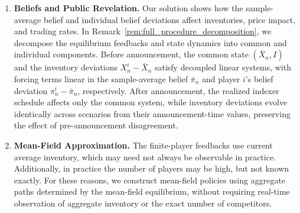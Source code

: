 \documentclass[12pt]{article}
\numberwithin{equation}{section}
\theoremstyle{definition}
\begin{document}
\begin{enumerate}
Standard ODE theory guarantees only local solvability of the Riccati
equation. The cost contains indefinite cross terms between trading rates
and outstanding impact, so there is no immediate bound ruling out
finite-time blow-up before the backward solution reaches time zero.
Yet, under the economically reasonable conditions ruling out price manipulation
stated in Assumption~\ref{ass:standing_model},
Theorem~\ref{thm:global_riccati_solvability} establishes upper and lower bounds
\begin{equation}\label{eq:intro_riccati_bounds}
-\underline H(t)\preceq H_n(t)\preceq\overline H(t),
\qquad 0\leq t\leq T,
\end{equation}
uniformly over \(n\geq2\). The bounds prevent finite-time blow-up and
yield a unique Riccati solution on every finite horizon and hence a
subgame-perfect Nash equilibrium. No short-horizon restriction or additional
smallness condition on transient impact is required.
To our knowledge, this is the first globally solvable continuous-time,
finite-player, closed-loop execution game with transient price impact.
Most related finite-player execution games instead study open-loop equilibria
\citep{strehle_2017,schied_zhang_2017,schied_strehle_zhang_2017,
schied_zhang_2019,luo_schied_2019,NeumanVoss2023,
campbell2026optimalexecutionntraders} for which existence of a Nash equilibrium is
usually easier to prove.

\item \textbf{Beliefs and Public Revelation.}
Our solution shows how the sample-average belief and individual belief
deviations affect inventories, price impact, and trading rates.
In Remark~\ref{rem:full_procedure_decomposition}, we decompose the equilibrium
feedbacks and state dynamics into common and individual components.
Before announcement, the common state \((\bar X_n,I)\) and the inventory
deviations \(X_n^i-\bar X_n\) satisfy decoupled linear systems, with forcing
terms linear in the sample-average belief \(\bar\pi_n\) and player \(i\)'s belief deviation
\(\pi_n^i-\bar\pi_n\), respectively.
After announcement, the realized indexer schedule affects only the common
system, while inventory deviations evolve identically across scenarios
from their announcement-time values, preserving the effect of pre-announcement
disagreement.

\item \textbf{Mean-Field Approximation.}
The finite-player feedbacks use current average inventory, which may need
not always be observable in practice. Additionally, in practice the number of players
may be high, but not known exactly. For these reasons, we
construct mean-field policies using aggregate paths determined by the
mean-field equilibrium, without requiring real-time observation of
aggregate inventory or the exact number of competitors.


\end{enumerate}
\end{document}
